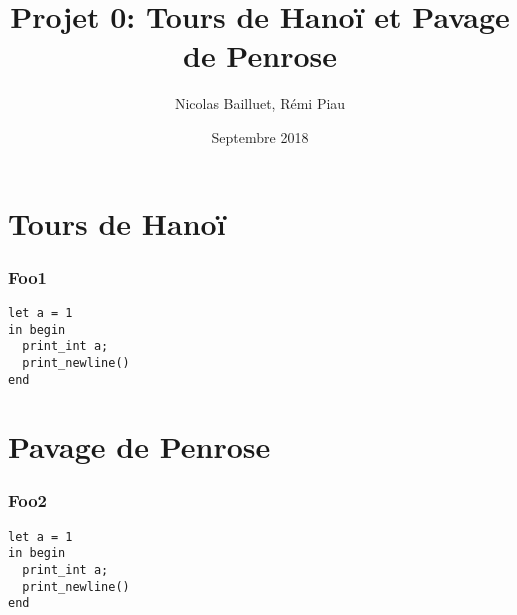 \documentclass[usenames,dvipsnames,14pt]{beamer}%
\author{Nicolas Bailluet, Rémi Piau}
\title{Projet 0: Tours de Hanoï et Pavage de Penrose}
\institute{L3, ENS Rennes}
\date{Septembre 2018}
\begin{document}
\beamertemplatenavigationsymbolsempty

\begin{frame}
\titlepage
\end{frame}

\begin{frame}
\tableofcontents
\end{frame}
\section{Tours de Hanoï}
\begin{frame}[fragile]%
\frametitle{Foo1}
\begin{verbatim}
let a = 1
in begin
  print_int a;
  print_newline()
end
\end{verbatim}
\end{frame}
\section{Pavage de Penrose}
\begin{frame}[fragile]%
\frametitle{Foo2}
\begin{verbatim}
let a = 1
in begin
  print_int a;
  print_newline()
end
\end{verbatim}
\end{frame}
\end{document}
